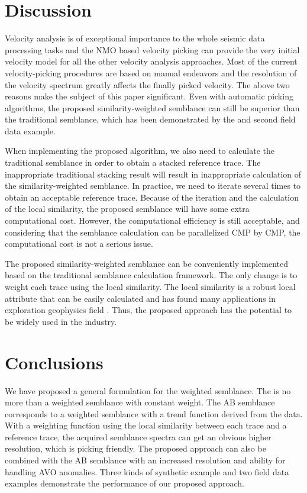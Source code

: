 \section{Discussion}
Velocity analysis is of exceptional importance to the whole seismic data processing tasks and the NMO based velocity picking can provide the very initial velocity model for all the other velocity analysis approaches. Most of the current velocity-picking procedures are based on manual endeavors and the resolution of the velocity spectrum greatly affects the finally picked velocity. The above two reasons make the subject of this paper significant. Even with automatic picking algorithms, the proposed similarity-weighted semblance can still be superior than the traditional semblance, which has been demonstrated by the  and  second field data example.

When implementing the proposed algorithm, we also need to calculate the traditional semblance in order to obtain a stacked reference trace. The inappropriate traditional stacking result will result in inappropriate calculation of the similarity-weighted semblance. In practice, we need to iterate several times to obtain an acceptable reference trace. Because of the iteration and the calculation of the local similarity, the proposed semblance will have some extra computational cost. However, the computational efficiency is still acceptable, and considering that the semblance calculation can be parallelized CMP by CMP, the computational cost is not a serious issue.

The proposed similarity-weighted semblance can be conveniently implemented based on the traditional semblance calculation framework. The only change is to weight each trace using the local similarity. The local similarity is a robust local attribute that can be easily calculated and has found many applications in exploration geophysics field \cite[]{guochang2009,yangkang2015ortho}. 
Thus, the proposed approach has the potential to be widely used in the industry.


\section{Conclusions}
We have proposed a general formulation for the weighted semblance. The  is no more than a weighted semblance with constant weight. The AB semblance corresponds to a weighted semblance with a trend function derived from the data. With a weighting function using the local similarity between each trace and a reference trace, the acquired semblance spectra can get an obvious higher resolution, which is picking friendly. The proposed approach can also be combined with the AB semblance with an increased resolution and ability for handling AVO anomalies. Three kinds of synthetic example and two field data examples demonstrate the performance of our proposed approach.

